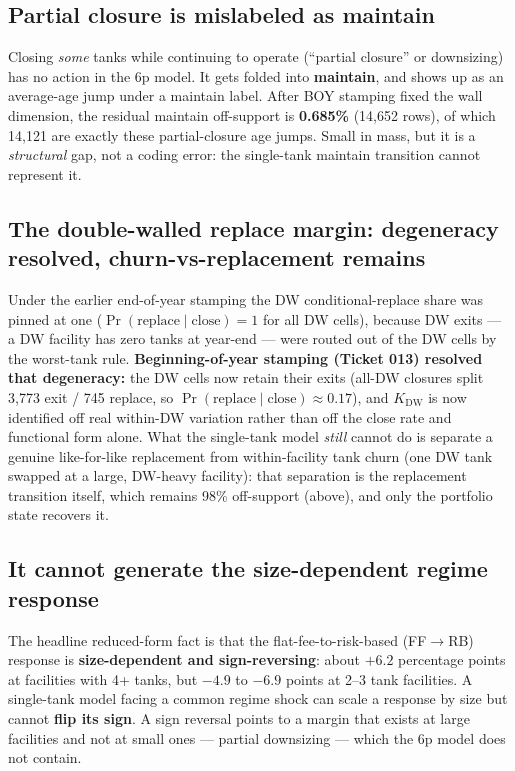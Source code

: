\documentclass[
  letterpaper,
  DIV=11,
  numbers=noendperiod]{scrartcl}
\begin{document}
\subsection{Partial closure is mislabeled as
maintain}\label{partial-closure-is-mislabeled-as-maintain}

Closing \emph{some} tanks while continuing to operate (``partial
closure'' or downsizing) has no action in the 6p model. It gets folded
into \textbf{maintain}, and shows up as an average-age jump under a
maintain label. After BOY stamping fixed the wall dimension, the
residual maintain off-support is \textbf{0.685\%} (14,652 rows), of
which 14,121 are exactly these partial-closure age jumps. Small in mass,
but it is a \emph{structural} gap, not a coding error: the single-tank
maintain transition cannot represent it.

\subsection{The double-walled replace margin: degeneracy resolved,
churn-vs-replacement
remains}\label{the-double-walled-replace-margin-degeneracy-resolved-churn-vs-replacement-remains}

Under the earlier end-of-year stamping the DW conditional-replace share
was pinned at one (\(\Pr(\text{replace} \mid \text{close}) = 1\) for all
DW cells), because DW exits --- a DW facility has zero tanks at year-end
--- were routed out of the DW cells by the worst-tank rule.
\textbf{Beginning-of-year stamping (Ticket 013) resolved that
degeneracy:} the DW cells now retain their exits (all-DW closures split
3,773 exit / 745 replace, so \(\Pr(\text{replace}\mid\text{close})
\approx 0.17\)), and \(K_{\text{DW}}\) is now identified off real
within-DW variation rather than off the close rate and functional form
alone. What the single-tank model \emph{still} cannot do is separate a
genuine like-for-like replacement from within-facility tank churn (one
DW tank swapped at a large, DW-heavy facility): that separation is the
replacement transition itself, which remains 98\% off-support (above),
and only the portfolio state recovers it.

\subsection{It cannot generate the size-dependent regime
response}\label{it-cannot-generate-the-size-dependent-regime-response}

The headline reduced-form fact is that the flat-fee-to-risk-based
(FF\(\to\)RB) response is \textbf{size-dependent and sign-reversing}:
about \(+6.2\) percentage points at facilities with 4+ tanks, but
\(-4.9\) to \(-6.9\) points at 2--3 tank facilities. A single-tank model
facing a common regime shock can scale a response by size but cannot
\textbf{flip its sign}. A sign reversal points to a margin that exists
at large facilities and not at small ones --- partial downsizing ---
which the 6p model does not contain.
\end{document}
